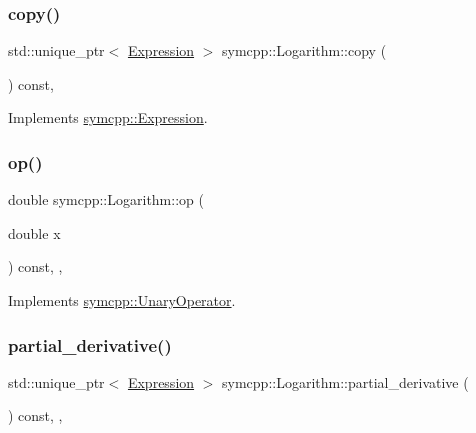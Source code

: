 \subsubsection{\texorpdfstring{copy()}{copy()}}
{\footnotesize\ttfamily std\+::unique\+\_\+ptr$<$ \mbox{\hyperlink{classsymcpp_1_1Expression}{Expression}} $>$ symcpp\+::\+Logarithm\+::copy (\begin{DoxyParamCaption}{ }\end{DoxyParamCaption}) const\hspace{0.3cm}{\ttfamily [override]}, {\ttfamily [virtual]}}



Implements \mbox{\hyperlink{classsymcpp_1_1Expression_a2e7de5a295ccf0efdc9b34cea7ba3d0b}{symcpp\+::\+Expression}}.

\mbox{\label{classsymcpp_1_1Logarithm_a349cbd26700ea28d18a42f6f8d7e722c}} 
\subsubsection{\texorpdfstring{op()}{op()}}
{\footnotesize\ttfamily double symcpp\+::\+Logarithm\+::op (\begin{DoxyParamCaption}\item[{double}]{x }\end{DoxyParamCaption}) const\hspace{0.3cm}{\ttfamily [override]}, {\ttfamily [private]}, {\ttfamily [virtual]}}



Implements \mbox{\hyperlink{classsymcpp_1_1UnaryOperator_a679c3c46cad3a62bdd776ff836c7891e}{symcpp\+::\+Unary\+Operator}}.

\mbox{\label{classsymcpp_1_1Logarithm_ab5cb1daed6613731d15ee13d17c48f7b}} 
\subsubsection{\texorpdfstring{partial\_derivative()}{partial\_derivative()}}
{\footnotesize\ttfamily std\+::unique\+\_\+ptr$<$ \mbox{\hyperlink{classsymcpp_1_1Expression}{Expression}} $>$ symcpp\+::\+Logarithm\+::partial\+\_\+derivative (\begin{DoxyParamCaption}{ }\end{DoxyParamCaption}) const\hspace{0.3cm}{\ttfamily [override]}, {\ttfamily [private]}, {\ttfamily [virtual]}}



